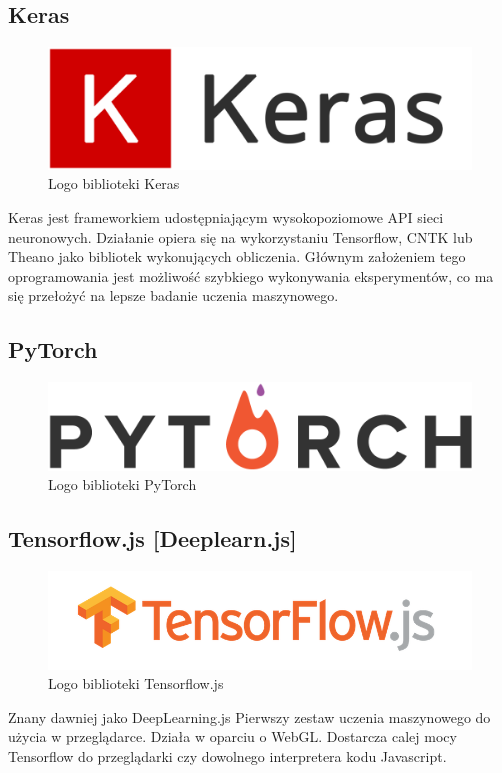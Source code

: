 \documentclass[12pt,a4paper,twoside,titlepage,openright]{book}
\begin{document}
\subsection{Keras}
\begin{figure}[h]
	\centering
			\includegraphics[resolution=120]{Keras.png}
		\caption{Logo biblioteki Keras}
\end{figure}
Keras jest frameworkiem udostępniającym wysokopoziomowe API sieci neuronowych. Działanie opiera się na wykorzystaniu Tensorflow, CNTK lub Theano jako bibliotek wykonujących obliczenia. Głównym założeniem tego oprogramowania jest możliwość szybkiego wykonywania eksperymentów, co ma się przełożyć na lepsze badanie uczenia maszynowego.

\subsection{PyTorch}
\begin{figure}[h]
	\centering
			\includegraphics[resolution=120]{PyTorch.png}
		\caption{Logo biblioteki PyTorch}
\end{figure}

\subsection{Tensorflow.js [Deeplearn.js]}
\begin{figure}[h]
	\centering
			\includegraphics[resolution=120]{TensorflowJS.png}
		\caption{Logo biblioteki Tensorflow.js}
\end{figure}
Znany dawniej jako DeepLearning.js Pierwszy zestaw uczenia maszynowego do użycia w przeglądarce. Działa w oparciu o WebGL. Dostarcza calej mocy Tensorflow do przeglądarki czy dowolnego interpretera kodu Javascript.
\end{document}
